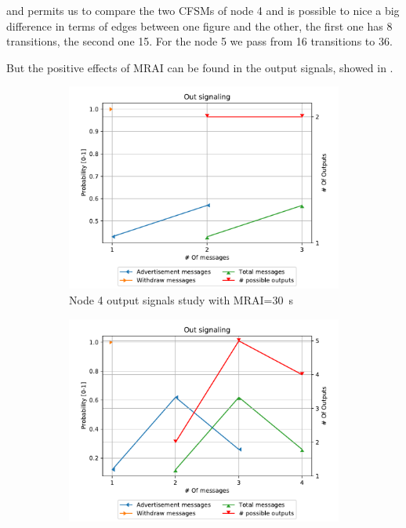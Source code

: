  and  permits us to compare the two
\ac{CFSM}s of node \num{4} and is possible to nice a big difference in terms of edges
between one figure and the other, the first one has \num{8} transitions, the
second one \num{15}.
For the node \num{5} we pass from \num{16} transitions to \num{36}.

But the positive effects of \ac{MRAI} can be found in the output signals, 
showed in .

\begin{figure}[h]
     \centering
     \begin{subfigure}[b]{0.45\textwidth}
         \centering
         \includegraphics[width=\textwidth]{images/signal_study/fig_4_MRAI/fig_4_4_signaling_nmessage_prob.pdf}
		 \caption{Node \num{4} output signals study with \ac{MRAI}=\SI{30}{\second}}
         \label{fig:signal_node4_MRAI}
     \end{subfigure}
     \hfill
     \begin{subfigure}[b]{0.45\textwidth}
         \centering
         \includegraphics[width=\textwidth]{images/signal_study/fig_4_MRAI/fig_4_5_signaling_nmessage_prob.pdf}

\end{subfigure}
\end{figure}

